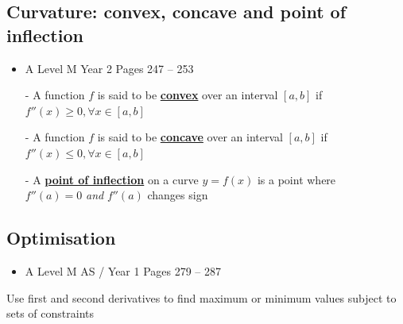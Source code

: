 \documentclass[11pt, a4paper]{article}
\begin{document}
\subsection{Curvature: convex, concave and point of inflection}
\begin{itemize}
\item A Level M Year 2 \hspace{1cm} \phantom{ AS / } Pages 247 -- 253
\end{itemize} \par
\begin{itemize}
\item[-] A function $f$ is said to be \underline{\textbf{convex}} over an interval $[a,b]$ if \\$f''(x)\geq0, \forall x \in[a,b]$
\item[-] A function $f$ is said to be \underline{\textbf{concave}} over an interval $[a,b]$ if \\$f''(x)\leq0, \forall x \in[a,b]$
\item[-] A \underline{\textbf{point of inflection}} on a curve $y=f(x)$ is a point where \\$f''(a)=0$ \emph{and} $f''(a)$ changes sign
\end{itemize}
\vspace{0.5cm}


\subsection{Optimisation}
\begin{itemize}
\item A Level M AS / Year 1 \hspace{1cm} \phantom{ } Pages 279 -- 287
\end{itemize} \par
Use first and second derivatives to find maximum or minimum values subject to sets of constraints
\vspace{0.5cm}
\end{document}
